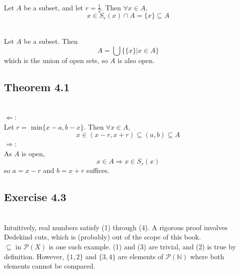 \begin{solution}
 \\Let $A$ be a subset, and let $r = \frac{1}{2}$. Then $\forall x \in A$,
 $$x \in S_r(x) \cap A = \{x\} \subseteq A$$
\end{solution}


\begin{solution}
 \\Let $A$ be a subset. Then
 $$A = \bigcup\{\{x\}|x \in A\}$$
 which is the union of open sets, so $A$ is also open.
\end{solution}

\subsection{Theorem 4.1}


\begin{solution}
 \\$\Leftarrow$: \\
 Let $r =$ min$\{x-a,b-x\}$. Then $\forall x \in A$,
 $$x \in (x-r,x+r) \subseteq (a,b) \subseteq A$$
 $\Rightarrow$: \\
 As $A$ is open,
 $$x \in A \Rightarrow x \in S_r(x)$$
 so $a = x - r$ and $b = x + r$ suffices.
\end{solution}

\subsection{Exercise 4.3}


\begin{solution}
 \\Intuitively, real numbers satisfy (1) through (4). A rigorous proof involves Dedekind cuts, which is (probably) out of the scope of this book. \\
 $\subseteq$ in $\mathcal{P}(X)$ is one such example. (1) and (3) are trivial, and (2) is true by definition. However, $\{1,2\}$ and $\{3,4\}$ are elements of $\mathcal{P}(\mathbb{N})$ where both elements cannot be compared.
\end{solution}

